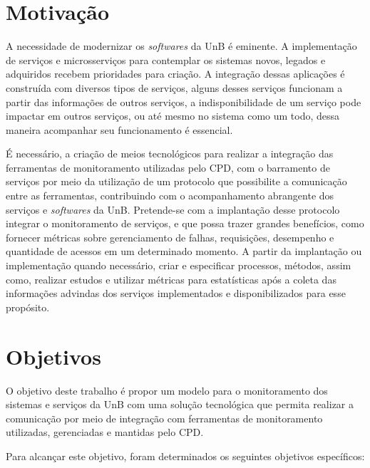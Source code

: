 
\section{Motivação}

A necessidade de modernizar os \textit{softwares} da \acrshort{UnB} é eminente. A implementação de serviços e microsserviços para contemplar os sistemas novos, legados e adquiridos recebem prioridades para criação. A integração dessas aplicações é construída com diversos tipos de serviços, alguns desses serviços funcionam a partir das informações de outros serviços, a indisponibilidade de um serviço pode impactar em outros serviços, ou até mesmo no sistema como um todo, dessa maneira acompanhar seu funcionamento é essencial.      

É necessário, a criação de meios tecnológicos para realizar a integração das ferramentas de monitoramento utilizadas pelo \acrshort{CPD}, com o barramento de serviços por meio da utilização de um protocolo que possibilite a comunicação entre as ferramentas, contribuindo com o acompanhamento abrangente dos serviços e \textit{softwares} da \acrshort{UnB}. Pretende-se com a implantação desse protocolo integrar o monitoramento de serviços, e que possa trazer grandes benefícios, como fornecer métricas sobre gerenciamento de falhas, requisições, desempenho e quantidade de acessos em um determinado momento. A partir da implantação ou implementação quando necessário, criar e especificar processos, métodos, assim como, realizar estudos e utilizar métricas para estatísticas após a coleta das informações advindas dos serviços implementados e disponibilizados para esse propósito.



\section{Objetivos}
\label{objetivos}

O objetivo deste trabalho é propor um modelo para o monitoramento dos sistemas e serviços da \acrfull{UnB} com uma solução tecnológica que permita realizar a comunicação por meio de integração com ferramentas de monitoramento utilizadas, gerenciadas e mantidas pelo \acrfull{CPD}.

Para alcançar este objetivo, foram determinados os seguintes objetivos específicos:

